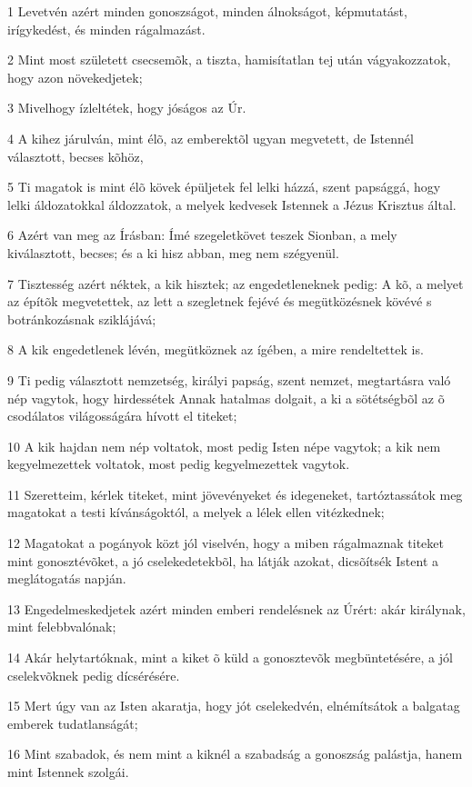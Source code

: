 \par 1 Levetvén azért minden gonoszságot, minden álnokságot, képmutatást, irígykedést, és minden rágalmazást.
\par 2 Mint most született csecsemõk, a tiszta, hamisítatlan tej után vágyakozzatok, hogy azon növekedjetek;
\par 3 Mivelhogy ízleltétek, hogy jóságos az Úr.
\par 4 A kihez járulván, mint élõ, az emberektõl ugyan megvetett, de Istennél választott, becses kõhöz,
\par 5 Ti magatok is mint élõ kövek épüljetek fel lelki házzá, szent papsággá, hogy lelki áldozatokkal áldozzatok, a melyek kedvesek Istennek a Jézus Krisztus által.
\par 6 Azért van meg az Írásban: Ímé szegeletkövet teszek Sionban, a mely kiválasztott, becses; és a ki hisz abban, meg nem szégyenül.
\par 7 Tisztesség azért néktek, a kik hisztek; az engedetleneknek pedig: A kõ, a melyet az építõk megvetettek, az lett a szegletnek fejévé és megütközésnek kövévé s botránkozásnak sziklájává;
\par 8 A kik engedetlenek lévén, megütköznek az ígében, a mire rendeltettek is.
\par 9 Ti pedig választott nemzetség, királyi papság, szent nemzet, megtartásra való nép vagytok, hogy hirdessétek Annak hatalmas dolgait, a ki a sötétségbõl az õ csodálatos világosságára hívott el titeket;
\par 10 A kik hajdan nem nép voltatok, most pedig Isten népe vagytok; a kik nem kegyelmezettek voltatok, most pedig kegyelmezettek vagytok.
\par 11 Szeretteim, kérlek titeket, mint jövevényeket és idegeneket, tartóztassátok meg magatokat a testi kívánságoktól, a melyek a lélek ellen vitézkednek;
\par 12 Magatokat a pogányok közt jól viselvén, hogy a miben rágalmaznak titeket mint gonosztévõket, a jó cselekedetekbõl, ha látják azokat, dicsõítsék Istent a meglátogatás napján.
\par 13 Engedelmeskedjetek azért minden emberi rendelésnek az Úrért: akár királynak, mint felebbvalónak;
\par 14 Akár helytartóknak, mint a kiket õ küld a gonosztevõk megbüntetésére, a jól cselekvõknek pedig dícsérésére.
\par 15 Mert úgy van az Isten akaratja, hogy jót cselekedvén, elnémítsátok a balgatag emberek tudatlanságát;
\par 16 Mint szabadok, és nem mint a kiknél a szabadság a gonoszság palástja, hanem mint Istennek szolgái.
